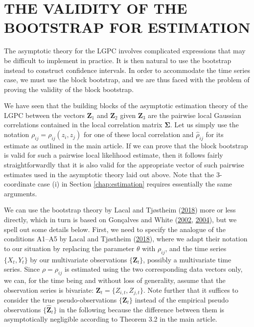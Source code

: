 \documentclass[
  12pt,
  letterpaper]{article}
\numberwithin{equation}{section}
\newcommand{\Z}{\bm{Z}}
\newcommand{\hZ}{\widehat{\bm{Z}}}
\newcommand{\hrho}{\widehat{\rho}}
\newcommand{\fSigma}{\bm{\Sigma}}
\begin{document}
\hypertarget{validity-bootstrap}{%
\section{THE VALIDITY OF THE BOOTSTRAP FOR ESTIMATION}\label{validity-bootstrap}}

The asymptotic theory for the LGPC involves complicated expressions that may be difficult to implement in practice. It is then natural to use the bootstrap instead to construct confidence intervals. In order to accommodate the time series case, we must use the block bootstrap, and we are thus faced with the problem of proving the validity of the block bootstrap.

We have seen that the building blocks of the asymptotic estimation theory of the LGPC between the vectors \(\Z_1\) and \(\Z_2\) given \(\Z_3\) are the pairwise local Gaussian correlations contained in the local correlation matrix \(\fSigma\). Let us simply use the notation \(\rho_{ij} = \rho_{ij}(z_i, z_j)\) for one of these local correlation and \(\hrho_{ij}\) for its estimate as outlined in the main article. If we can prove that the block bootstrap is valid for such a pairwise local likelihood estimate, then it follows fairly straightforwardly that it is also valid for the appropriate vector of such pairwise estimates used in the asymptotic theory laid out above. Note that the 3-coordinate case (i) in Section \ref{chap:estimation} requires essentially the same arguments.

We can use the bootstrap theory by Lacal and Tjøstheim (\protect\hyperlink{ref-lacal2018estimating}{2018}) more or less directly, which in turn is based on Gon\c{c}alves and White (\protect\hyperlink{ref-gonccalves2002bootstrap}{2002}, \protect\hyperlink{ref-gonccalves2004maximum}{2004}), but we spell out some details below. First, we need to specify the analogue of the conditions A1--A5 by Lacal and Tjøstheim (\protect\hyperlink{ref-lacal2018estimating}{2018}), where we adapt their notation to our situation by replacing the parameter \(\theta\) with \(\rho_{ij}\), and the time series \(\{X_t, Y_t\}\) by our multivariate observations \(\{\Z_t\}\), possibly a multivariate time series. Since \(\rho = \rho_{ij}\) is estimated using the two corresponding data vectors only, we can, for the time being and without loss of generality, assume that the observation series is bivariate: \({\Z_t} = \{Z_{i,t}, Z_{j,t}\}\). Note further that it suffices to consider the true pseudo-observations \(\{\Z_t\}\) instead of the empirical pseudo observations \(\{\hZ_t\}\) in the following because the difference between them is asymptotically negligible according to Theorem 3.2 in the main article.
\end{document}
